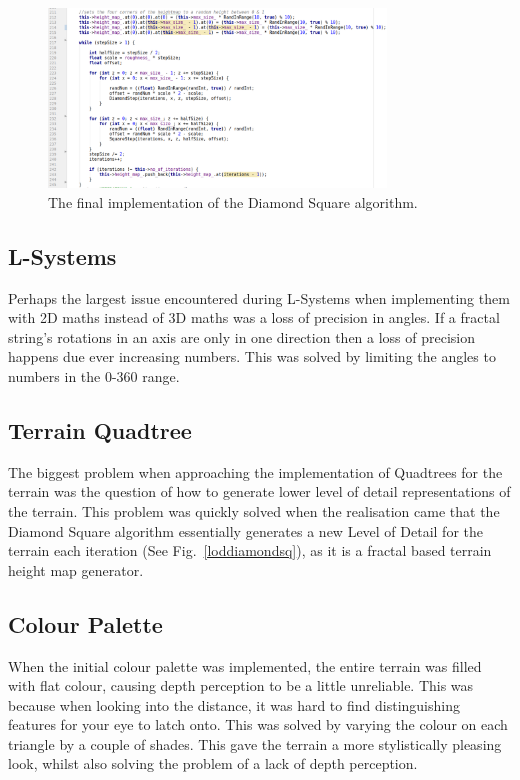 \documentclass[a4paper,10pt]{report}
\begin{document}
\begin{figure}[h!]
    \centering
  \includegraphics[width=0.8\textwidth]{Images/Code-Snippets/DiamondSquareAlgorithm.png}
 \caption{The final implementation of the Diamond Square algorithm.}
 \label{fig:diamondsquareimpl}
\end{figure}

\subsection{L-Systems}

Perhaps the largest issue encountered during L-Systems when implementing them with 2D maths instead of 3D maths was a loss of precision in angles. If a fractal string's rotations in an axis are only in  one direction then a loss of precision happens due ever increasing numbers. This was solved by limiting the angles to numbers in the 0-360 range.

\subsection{Terrain Quadtree}

The biggest problem when approaching the implementation of Quadtrees for the terrain was the question of how to generate lower level of detail representations of the terrain. This problem was quickly solved when the realisation came that the Diamond Square algorithm essentially generates a new Level of Detail for the terrain each iteration (See Fig.~\ref{loddiamondsq}), as it is a fractal based terrain height map generator. 

\subsection{Colour Palette}
When the initial colour palette was implemented, the entire terrain was filled with flat colour, causing depth perception to be a little unreliable. This was because when looking into the distance, it was hard to find distinguishing features for your eye to latch onto. This was solved by varying the colour on each triangle by a couple of shades. This gave the terrain a more stylistically pleasing look, whilst also solving the problem of a lack of depth perception. 
\end{document}
